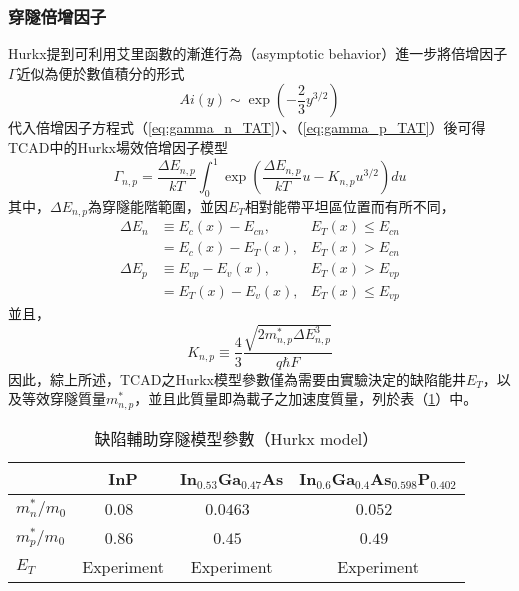 \subsubsection{穿隧倍增因子}
Hurkx提到可利用艾里函數的漸進行為（asymptotic behavior）進一步將倍增因子$\Gamma$近似為便於數值積分的形式~\cite{Hurkx:2004wr}
\begin{equation}
Ai(y)\sim\exp\left(-\frac{2}{3}y^{3/2}\right)
\end{equation}
代入倍增因子方程式（\ref{eq:gamma_n_TAT}）、（\ref{eq:gamma_p_TAT}）後可得TCAD中的Hurkx場效倍增因子模型~\cite{sentaurus2016sdevice}
\begin{equation}
\Gamma_{n,p}=\frac{\Delta E_{n,p}}{kT}\int_0^1\exp\left(\frac{\Delta E_{n,p}}{kT}u-K_{n,p}u^{3/2}\right)du
\end{equation}
其中，$\Delta E_{n,p}$為穿隧能階範圍，並因$E_T$相對能帶平坦區位置而有所不同，
\begin{equation}
\begin{aligned}
\Delta E_{n}&\equiv E_c(x)-E_{cn},&E_T(x)\leq E_{cn}\\[5pt]
&=E_c(x)-E_T(x),&E_T(x)>E_{cn}\\[5pt]
\Delta E_{p}&\equiv E_{vp}-E_v(x),&E_T(x)>E_{vp}\\[5pt]
&=E_T(x)-E_v(x),&E_T(x)\leq E_{vp}
\end{aligned}
\end{equation}
並且，
\begin{equation}
K_{n,p}\equiv \frac{4}{3}\frac{\sqrt{2m_{n,p}^*\Delta E_{n,p}^3}}{q\hbar F}
\end{equation}
因此，綜上所述，TCAD之Hurkx模型參數僅為需要由實驗決定的缺陷能井$E_T$，以及等效穿隧質量$m_{n,p}^*$，並且此質量即為載子之加速度質量，列於表（\ref{t:tat-parameter}）中。
\begin{table}[h]
\begin{center}
\caption[缺陷輔助穿隧模型參數]{缺陷輔助穿隧模型參數（Hurkx model）} \label{t:tat-parameter}
\begin{tabular}{lccc}

\hline
  &  InP  & In$_{0.53}$Ga$_{0.47}$As & In$_{0.6}$Ga$_{0.4}$As$_{0.598}$P$_{0.402}$  \\
\hline
$m_n^*/m_0$	&  $0.08$~\cite{parks1996theoretical}	&	$0.0463$~\cite{parks1996theoretical}	&	$0.052$~\cite{paul1991empirical}\\
$m_p^*/m_0$	&  $0.86$~\cite{wang2008dark}	&	$0.45$~\cite{wang2008dark}	&	$0.49$~\cite{goldberg1999handbook}\\
$E_T$	&  Experiment	&	Experiment	&	Experiment\\
\hline

\end{tabular}
\end{center}
\end{table}
